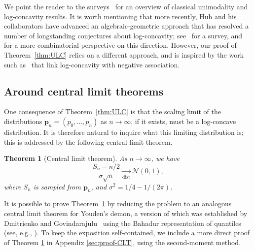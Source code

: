 \documentclass[12pt,english,reqno]{amsart}
\theoremstyle{plain}
\newtheorem{thm}{Theorem}[section]
\theoremstyle{remark}
\numberwithin{figure}{section}
\numberwithin{equation}{section}
\begin{document}
We point the reader to the surveys~\citep{Bre1,Bre2,Sta} for an overview of classical unimodality and
log-concavity results. It is worth mentioning that more recently, Huh and his collaborators have advanced an algebraic-geometric approach that has resolved a number of longstanding conjectures about log-concavity; see~\cite{Huh} for a survey,
and~\cite{CP} for a more combinatorial perspective on this direction. However, our proof of Theorem~\ref{thm:ULC} relies on a different approach, and is inspired by the work such as~\cite{Pem,BBL,KN} that link log-concavity with negative association.

\subsection*{Around central limit theorems}\label{ss:mountain} One consequence of Theorem~\ref{thm:ULC} is that the scaling limit of the distributions $\mathbf{p}_n = ( p_0, \dots, p_n )$ as $n \to \infty$, if it exists, must be a log-concave distribution. It is therefore natural to inquire what this limiting distribution is; this is addressed by the following central limit theorem.

\begin{thm}[Central limit theorem]\label{thm:CLT}
	As $n \to \infty$, we have
	\[ \frac{S_n- n/2}{\sigma \sqrt{n}} \xrightarrow[\mathrm{dist}]{} \mathcal{N}(0,1),\]
	where $S_n$ is sampled from $\mathbf{p}_n$, and $\sigma^2 = {1}/{4}-{1}/{(2\pi)}$.
\end{thm}

It is possible to prove Theorem~\ref{thm:CLT} by reducing the problem to an analogous central limit theorem for Youden's demon, a version of which was established by Dmitrienko and Govindarajulu~\citep[Thm3.1]{DmiGov97} using the Bahadur representation of quantiles (see, e.g., \citep{Ghosh}).
To keep the exposition self-contained, we include a more direct proof of Theorem \ref{thm:CLT} in Appendix \ref{sec:proof-CLT}, using the second-moment method.

\end{document}
